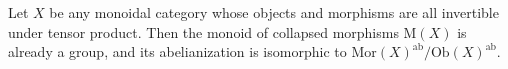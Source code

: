 \documentclass{amsbook} %
\newcommand{\bigquotient}[2]{ \raisebox{0.75\height}{$#1$} \mkern-12mu\scalebox{2}{$\diagup$}\mkern-10mu \raisebox{-0.5\height}{$#2$} }
\numberwithin{section}{chapter}
\begin{document}
\begin{prop} \label{colquot} Let $X$ be any monoidal category whose objects and morphisms are all invertible under tensor product. Then the monoid of collapsed morphisms $\mathrm{M}(X)$ is already a group, and its abelianization is isomorphic to $\mathrm{Mor}(X)^{\mathrm{ab}}/ \mathrm{Ob}(X)^{\mathrm{ab}}$.
%
\end{prop}
\end{document}
